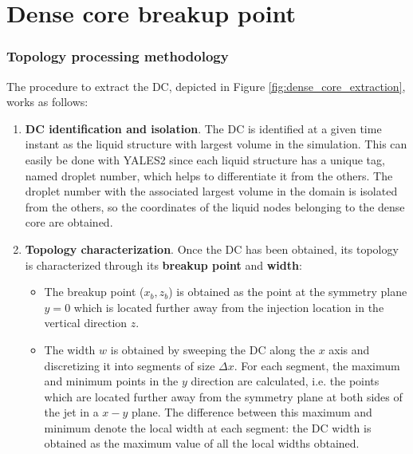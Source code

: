 \section{Dense core breakup point}
\label{app:processing_JICF_DC_breakup_point}


\subsubsection*{Topology processing methodology}

The procedure to extract the DC, depicted in Figure \ref{fig:dense_core_extraction}, works as follows:

\begin{enumerate}

	\item \textbf{DC identification and isolation}. The DC is identified at a given time instant as the liquid structure with largest volume in the simulation. This can easily be done with YALES2 since each liquid structure has a unique tag, named droplet number, which helps to differentiate it from the others. The droplet number with the associated largest volume in the domain is isolated from the others, so the coordinates of the liquid nodes belonging to the dense core are obtained.
	
	\item \textbf{Topology characterization}. Once the DC has been obtained, its topology is characterized through its \textbf{breakup point} and \textbf{width}:
	
	\begin{itemize}
	
	
		\item The breakup point ($x_b, z_b$) is obtained as the point at the symmetry plane $y = 0$ which is located further away from the injection location in the vertical direction $z$.
		
		\item The width $w$ is obtained by sweeping the DC along the $x$ axis and discretizing it into segments of size $\Delta x$. For each segment, the maximum and minimum points in the $y$ direction are calculated, i.e. the points which are located further away from the symmetry plane at both sides of the jet in a $x-y$ plane. The difference between this maximum and minimum denote the local width at each segment: the DC width is obtained as the maximum value of all the local widths obtained.
	
	\end{itemize}
	
\end{enumerate}

